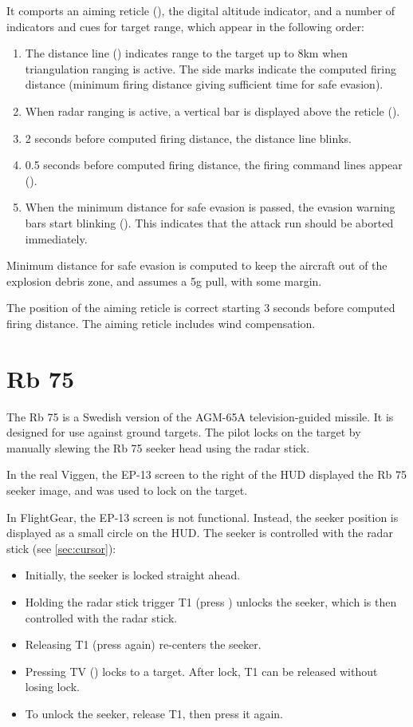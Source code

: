 It comports an aiming reticle (),
the digital altitude indicator, and a number of indicators and cues for target range,
which appear in the following order:
\begin{enumerate}
  \item The distance line ()
    indicates range to the target up to 8km when triangulation ranging is active.
    The side marks indicate the computed firing distance
    (minimum firing distance giving sufficient time for safe evasion).
  \item When radar ranging is active, a vertical bar is displayed above the reticle
    ().
  \item 2 seconds before computed firing distance, the distance line blinks.
  \item 0.5 seconds before computed firing distance, the firing command lines appear
    ().
  \item When the minimum distance for safe evasion is passed,
    the evasion warning bars start blinking ().
    This indicates that the attack run should be aborted immediately.
\end{enumerate}

Minimum distance for safe evasion is computed to keep the aircraft out of the
explosion debris zone, and assumes a 5g pull, with some margin.

The position of the aiming reticle is correct starting 3 seconds before computed firing distance.
The aiming reticle includes wind compensation.


\section{Rb 75}\label{sec:rb75}
The Rb 75 is a Swedish version of the AGM-65A television-guided missile.
It is designed for use against ground targets.
The pilot locks on the target by manually slewing the Rb 75 seeker head using the radar stick.

In the real Viggen, the EP-13 screen to the right of the HUD displayed the Rb
75 seeker image, and was used to lock on the target.

In FlightGear, the EP-13 screen is not functional.
Instead, the seeker position is displayed as a small circle on the HUD.
The seeker is controlled with the radar stick (see \cref{sec:cursor}):
\begin{itemize}[noitemsep]
  \item Initially, the seeker is locked straight ahead.
  \item Holding the radar stick trigger T1 (press ) unlocks the seeker,
    which is then controlled with the radar stick.
  \item Releasing T1 (press  again) re-centers the seeker.
  \item Pressing TV () locks to a target. After lock, T1 can be released without losing lock.
  \item To unlock the seeker, release T1, then press it again.
\end{itemize}

